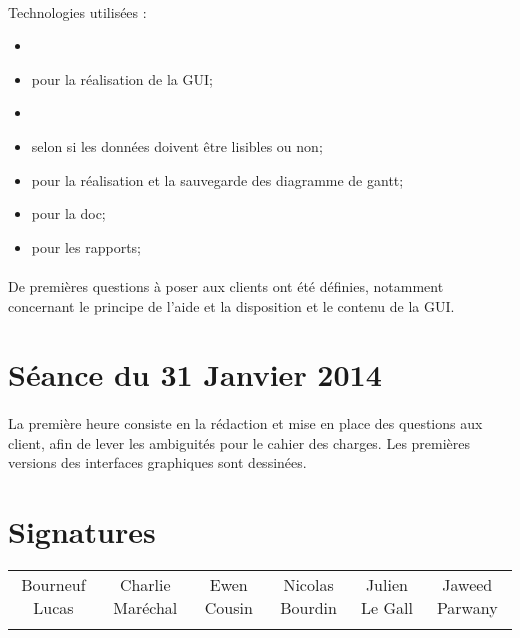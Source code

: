     	\paragraph*{}
	Technologies utilisées :
	\begin{itemize}
		\item[- github;]
		\item[- GTK2, glade,] pour la réalisation de la GUI;
		\item[- ruby 1.9;]
		\item[- Marshall/YamL/ORM,] selon si les données doivent être lisibles ou non;
		\item[- ganttproject,] pour la réalisation et la sauvegarde des diagramme de gantt;
		\item[- rdoc] pour la doc;
		\item[- \LaTeX,] pour les rapports;
	\end{itemize}
    	\paragraph*{}
	De premières questions à poser aux clients ont été définies, notamment concernant le principe de l'aide et la disposition et le contenu de la GUI.




\section{Séance du 31 Janvier 2014}
    	\paragraph*{}
	La première heure consiste en la rédaction et mise en place des questions aux client, afin de lever les ambiguités pour le cahier des charges.
	Les premières versions des interfaces graphiques sont dessinées.




\section{Signatures}
    	\begin{tabular*}{0.75\textwidth}{c | c | c | c | c | c}
    	    Bourneuf Lucas & Charlie Maréchal & Ewen Cousin & Nicolas Bourdin & Julien Le Gall & Jaweed Parwany\\
     	     & & & & &
    	\end{tabular*}

